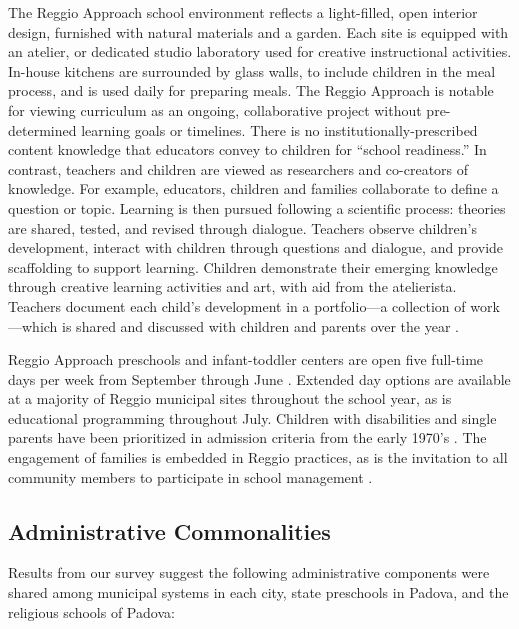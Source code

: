 The Reggio Approach school environment reflects a light-filled, open interior design, furnished with natural materials and a garden. Each site is equipped with an atelier, or dedicated studio laboratory used for creative instructional activities. In-house kitchens are surrounded by glass walls, to include children in the meal process, and is used daily for preparing meals. The Reggio Approach is notable for viewing curriculum as an ongoing, collaborative project without pre-determined learning goals or timelines. There is no institutionally-prescribed content knowledge that educators convey to children for ``school readiness.'' In contrast, teachers and children are viewed as researchers and co-creators of knowledge. For example, educators, children and families collaborate to define a question or topic. Learning is then pursued following a scientific process: theories are shared, tested, and revised through dialogue. Teachers observe children's development, interact with children through questions and dialogue, and provide scaffolding to support learning. Children demonstrate their emerging knowledge through creative learning activities and art, with aid from the atelierista. Teachers document each child's development in a portfolio---a collection of work---which is shared and discussed with children and parents over the year \citep{Rinaldi_2006_ReggioEmilia_BOOK,Giudici-Nicolosi_2014_Reggio-Approach}. 

Reggio Approach preschools and infant-toddler centers are open five full-time days per week from September through June \citep{Giudici-Nicolosi_2014_Reggio-Approach}. Extended day options are available at a majority of Reggio municipal sites throughout the school year, as is educational programming throughout July. Children with disabilities and single parents have been prioritized in admission criteria from the early 1970's \citep{Edwards-etal-eds_1998_Hundred-Languages}. The engagement of families is embedded in Reggio practices, as is the invitation to all community members to participate in school management \citep{CEHD_2016_Historical-Analysis,Cagliari-etal-eds_2016_BOOK_Loris-Malaguzzi}. 


\subsection{Administrative Commonalities}

Results from our survey suggest the following administrative components were shared among municipal systems in each city, state preschools in Padova, and the religious schools of Padova: 

